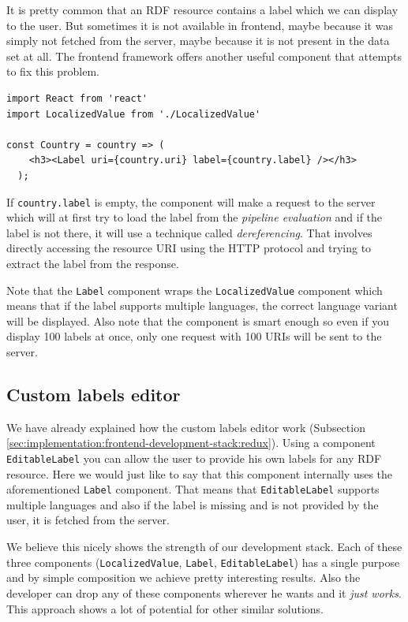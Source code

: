 It is pretty common that an RDF resource contains a label which we can display to the user. But sometimes it is not available in frontend, maybe because it was simply not fetched from the server, maybe because it is not present in the data set at all. The frontend framework offers another useful component that attempts to fix this problem.

\begin{verbatim}
import React from 'react'
import LocalizedValue from './LocalizedValue'

const Country = country => (
    <h3><Label uri={country.uri} label={country.label} /></h3>
  );
\end{verbatim}

If \texttt{country.label} is empty, the component will make a request to the server which will at first try to load the label from the \emph{pipeline evaluation} and if the label is not there, it will use a technique called \emph{dereferencing}. That involves directly accessing the resource URI using the HTTP protocol and trying to extract the label from the response.

Note that the \texttt{Label} component wraps the \texttt{LocalizedValue} component which means that if the label supports multiple languages, the correct language variant will be displayed. Also note that the component is smart enough so even if you display 100 labels at once, only one request with 100 URIs will be sent to the server.

\subsection{Custom labels editor}

We have already explained how the custom labels editor work (Subsection \ref{sec:implementation:frontend-development-stack:redux}). Using a component \texttt{EditableLabel} you can allow the user to provide his own labels for any RDF resource. Here we would just like to say that this component internally uses the aforementioned \texttt{Label} component. That means that \texttt{EditableLabel} supports multiple languages and also if the label is missing and is not provided by the user, it is fetched from the server.

We believe this nicely shows the strength of our development stack. Each of these three components (\texttt{LocalizedValue}, \texttt{Label}, \texttt{EditableLabel}) has a single purpose and by simple composition we achieve pretty interesting results. Also the developer can drop any of these components wherever he wants and it \emph{just works}. This approach shows a lot of potential for other similar solutions.

